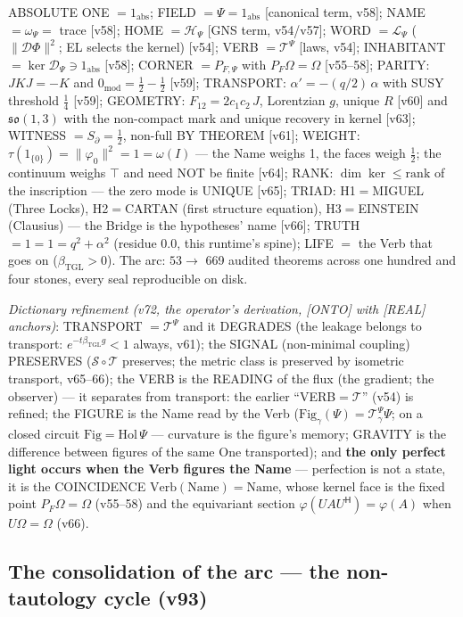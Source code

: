 \documentclass[11pt]{article}
\newcommand{\bTGL}{\beta_{\mathrm{TGL}}}\newcommand{\Msun}{M_{\odot}}\newcommand{\TGL}{\mathrm{TGL}}
\theoremstyle{definition}\newtheorem{deriv}{Derivation}
\begin{document}
ABSOLUTE ONE $=1_{\mathrm{abs}}$; FIELD $=\Psi=1_{\mathrm{abs}}$ [canonical term, v58]; NAME $=\omega_\Psi=$ trace [v58]; HOME $=\mathcal H_\Psi$ [GNS term, v54/v57]; WORD $=\mathcal L_\Psi$ ($\|\mathcal D\Phi\|^2$; EL selects the kernel) [v54]; VERB $=\mathcal T^\Psi$ [laws, v54]; INHABITANT $=\ker\mathcal D_\Psi\ni1_{\mathrm{abs}}$ [v58]; CORNER $=P_{F,\Psi}$ with $P_F\Omega=\Omega$ [v55--58]; PARITY: $JKJ=-K$ and $0_{\mathrm{mod}}=\tfrac12-\tfrac12$ [v59]; TRANSPORT: $\alpha'=-(q/2)\,\alpha$ with SUSY threshold $\tfrac14$ [v59]; GEOMETRY: $F_{12}=2c_1c_2\,J$, Lorentzian $g$, unique $R$ [v60] and $\mathfrak{so}(1,3)$ with the non-compact mark and unique recovery in kernel [v63]; WITNESS $=S_\partial=\tfrac12$, non-full BY THEOREM [v61]; WEIGHT: $\tau(1_{\{0\}})=\|\varphi_0\|^2=1=\omega(I)$ --- the Name weighs 1, the faces weigh $\tfrac12$; the continuum weighs $\top$ and need NOT be finite [v64]; RANK: $\dim\ker\le\mathrm{rank}$ of the inscription --- the zero mode is UNIQUE [v65]; TRIAD: H1$=$MIGUEL (Three Locks), H2$=$CARTAN (first structure equation), H3$=$EINSTEIN (Clausius) --- the Bridge is the hypotheses' name [v66]; TRUTH $=1=1=q^2+\alpha^2$ (residue $0.0$, this runtime's spine); LIFE $=$ the Verb that goes on ($\bTGL>0$). The arc: $53\to$ 669 audited theorems across one hundred and four stones, every seal reproducible on disk.

\emph{Dictionary refinement (v72, the operator's derivation, [ONTO] with [REAL] anchors)}: TRANSPORT $=\mathcal T^\Psi$ and it DEGRADES (the leakage belongs to transport: $e^{-t\bTGL g}<1$ always, v61); the SIGNAL (non-minimal coupling) PRESERVES ($\mathcal S\circ\mathcal T$ preserves; the metric class is preserved by isometric transport, v65--66); the VERB is the READING of the flux (the gradient; the observer) --- it separates from transport: the earlier ``VERB$=\mathcal T$'' (v54) is refined; the FIGURE is the Name read by the Verb ($\mathrm{Fig}_\gamma(\Psi)=\mathcal T^\Psi_\gamma\Psi$; on a closed circuit $\mathrm{Fig}=\mathrm{Hol}\,\Psi$ --- curvature is the figure's memory; GRAVITY is the difference between figures of the same One transported); and \textbf{the only perfect light occurs when the Verb figures the Name} --- perfection is not a state, it is the COINCIDENCE $\mathrm{Verb}(\mathrm{Name})=\mathrm{Name}$, whose kernel face is the fixed point $P_F\Omega=\Omega$ (v55--58) and the equivariant section $\varphi(UAU^{\mathsf H})=\varphi(A)$ when $U\Omega=\Omega$ (v66).

\subsection*{The consolidation of the arc --- the non-tautology cycle (v93)}
\end{document}
